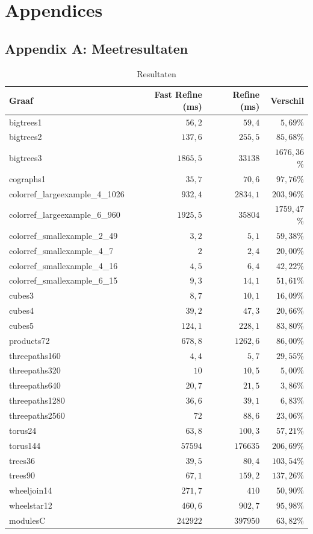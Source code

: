 \documentclass[twoside]{article}
\begin{document}
\section{Appendices}
\subsection{Appendix A: Meetresultaten} \label{AppendixA}

\begin{table}[H]
\caption{Resultaten}\label{table:resultaten}
\centering
\begin{tabular}{lrrr}
\toprule
Graaf & Fast Refine (ms) & Refine (ms) & Verschil \\
\midrule
\midrule
bigtrees1 & $56,2$ & $59,4$ & $5,69$\% \\
bigtrees2 & $137,6$ & $255,5$ & $85,68$\% \\
bigtrees3 & $1865,5$ & $33138$ & $1676,36$\% \\
cographs1 & $35,7$ & $70,6$ & $97,76$\% \\
colorref\_largeexample\_4\_1026 & $932,4$ & $2834,1$ & $203,96$\% \\
colorref\_largeexample\_6\_960 & $1925,5$ & $35804$ & $1759,47$\% \\
colorref\_smallexample\_2\_49 & $3,2$ & $5,1$ & $59,38$\% \\
colorref\_smallexample\_4\_7 & $2$ & $2,4$ & $20,00$\% \\
colorref\_smallexample\_4\_16 & $4,5$ & $6,4$ & $42,22$\% \\
colorref\_smallexample\_6\_15 & $9,3$ & $14,1$ & $51,61$\% \\
cubes3 & $8,7$ & $10,1$ & $16,09$\% \\
cubes4 & $39,2$ & $47,3$ & $20,66$\% \\
cubes5 & $124,1$ & $228,1$ & $83,80$\% \\
products72 & $678,8$ & $1262,6$ & $86,00$\% \\
threepaths160 & $4,4$ & $5,7$ & $29,55$\% \\
threepaths320 & $10$ & $10,5$ & $5,00$\% \\
threepaths640 & $20,7$ & $21,5$ & $3,86$\% \\
threepaths1280 & $36,6$ & $39,1$ & $6,83$\% \\
threepaths2560 & $72$ & $88,6$ & $23,06$\% \\
torus24 & $63,8$ & $100,3$ & $57,21$\% \\
torus144 & $57594$ & $176635$ & $206,69$\% \\
trees36 & $39,5$ & $80,4$ & $103,54$\% \\
trees90 & $67,1$ & $159,2$ & $137,26$\% \\
wheeljoin14 & $271,7$ & $410$ & $50,90$\% \\
wheelstar12 & $460,6$ & $902,7$ & $95,98$\% \\
modulesC & $242922$ & $397950$ & $63,82$\% \\

\bottomrule
\end{tabular}
\end{table}
\end{document}
